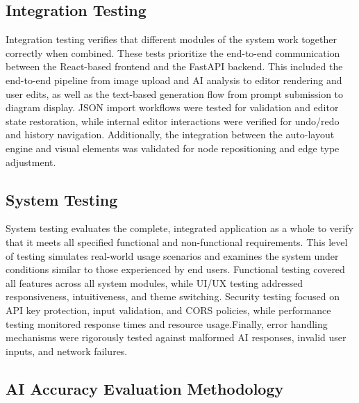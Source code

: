\subsection{Integration Testing}
\label{subsec:integration-testing}

Integration testing verifies that different modules of the 
system work together correctly when combined. These tests prioritize the end-to-end 
communication between the React-based frontend and the FastAPI 
backend. This included the end-to-end pipeline from image upload and AI analysis to editor rendering and user edits, as well as the text-based generation flow from prompt submission to diagram display. JSON import workflows were tested for validation and editor state restoration, while internal editor interactions were verified for undo/redo and history navigation. Additionally, the integration between the auto-layout engine and visual elements was validated for node repositioning and edge type adjustment.

\subsection{System Testing}
\label{subsec:system-testing}

System testing evaluates the complete, integrated application 
as a whole to verify that it meets all specified functional 
and non-functional requirements. This level of testing 
simulates real-world usage scenarios and examines the system 
under conditions similar to those experienced by end users. 
Functional testing covered all features across all system modules, while UI/UX testing addressed responsiveness, intuitiveness, and theme switching. Security testing focused on API key protection, input validation, and CORS policies, while performance testing monitored response times and resource usage.Finally, error handling mechanisms were rigorously tested against malformed AI responses, invalid user inputs, and network failures.


\subsection{AI Accuracy Evaluation Methodology}
\label{subsec:accuracy-eval}

